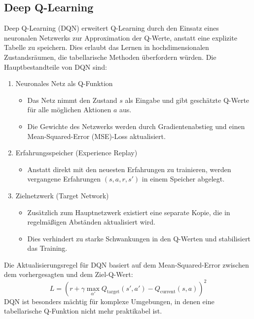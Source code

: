 \subsection{Deep Q-Learning}
Deep Q-Learning (DQN) erweitert Q-Learning durch den Einsatz eines neuronalen 
Netzwerks zur Approximation der Q-Werte, anstatt eine explizite Tabelle zu 
speichern. Dies erlaubt das Lernen in hochdimensionalen Zustandsräumen, die 
tabellarische Methoden überfordern würden.
Die Hauptbestandteile von DQN sind:
\begin{enumerate}
    \item Neuronales Netz als Q-Funktion
        \begin{itemize}
            \item Das Netz nimmt den Zustand $s$ als Eingabe und gibt geschätzte Q-Werte für alle möglichen Aktionen $a$ aus.
            \item Die Gewichte des Netzwerks werden durch Gradientenabstieg und einen Mean-Squared-Error (MSE)-Loss aktualisiert.
        \end{itemize}
    \item Erfahrungsspeicher (Experience Replay)
        \begin{itemize}
            \item Anstatt direkt mit den neuesten Erfahrungen zu trainieren, werden vergangene Erfahrungen $(s,a,r,s')$ in einem Speicher abgelegt.
        \end{itemize}
    \item Zielnetzwerk (Target Network)
        \begin{itemize}
            \item Zusätzlich zum Hauptnetzwerk existiert eine separate Kopie, die in regelmäßigen Abständen aktualisiert wird.
            \item Dies verhindert zu starke Schwankungen in den Q-Werten und stabilisiert das Training.
        \end{itemize}
\end{enumerate}
Die Aktualisierungsregel für DQN basiert auf dem Mean-Squared-Error zwischen dem 
vorhergesagten und dem Ziel-Q-Wert:
\begin{equation}
    L = \left(r + \gamma \max_{\alpha'}Q_{\text{target}}(s',a') - Q_{\text{current}}(s,a)\right)^2
\end{equation}
DQN ist besonders mächtig für komplexe Umgebungen, in denen eine tabellarische 
Q-Funktion nicht mehr praktikabel ist.

